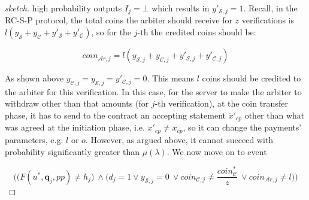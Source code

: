 \begin{proof}[sketch]
high probability outputs $I_{\scriptscriptstyle j}=\bot$ which results in $y'_{\scriptscriptstyle\mathcal{S},j}=1$. Recall, in the RC-S-P protocol, the total coins the arbiter should receive for $z$ verifications is $l(y_{\scriptscriptstyle\mathcal S}+y_{\scriptscriptstyle\mathcal C}+y'_{\scriptscriptstyle\mathcal S}+y'_{\scriptscriptstyle\mathcal C})$, so for the $j$-th the credited coins should be: 
     
     
     \begin{equation}\label{equ::arbiter}
    coin_{\scriptscriptstyle\mathcal{A}r,j}= l(y_{\scriptscriptstyle\mathcal {S},j}+y_{\scriptscriptstyle\mathcal {C},j}+y'_{\scriptscriptstyle\mathcal {S},j}+y'_{\scriptscriptstyle\mathcal {C},j})
     \end{equation}

As shown above $y_{\scriptscriptstyle\mathcal{C},j}=y_{\scriptscriptstyle\mathcal{S},j}=y'_{\scriptscriptstyle\mathcal{C},j}=0$. This means $l$ coins should be credited to the arbiter for this verification.  In this case, for the server to make the arbiter to withdraw other than that amounts (for $j$-th verification), at the coin transfer phase, it has to send to the contract  an accepting  statement $\ddot{x}'_{\scriptscriptstyle cp}$ other than what was agreed at the initiation phase, i.e. $\ddot{x}'_{\scriptscriptstyle cp}\neq\ddot{x}_{\scriptscriptstyle cp}$, so it can change the payments' parameters, e.g. $l$ or $o$. However, as argued above, it cannot succeed with probability significantly greater than $\mu(\lambda)$. We now move on to event 
     
     $$\Bigg(\Big(F(u^{\scriptscriptstyle *}, \bm{q}_{\scriptscriptstyle j}, {pp})\neq h_{\scriptscriptstyle j}\Big) \ \wedge \Big(d_{\scriptscriptstyle j}=1	\vee y_{\scriptscriptstyle \mathcal {S},j}=0 \ \vee coin_{\scriptscriptstyle\mathcal{C},j}\neq \frac{coin_{\scriptscriptstyle\mathcal C}^{\scriptscriptstyle*}}{z} \ \vee  coin_{\scriptscriptstyle\mathcal{A}r,j}\neq l\Big)\Bigg)$$
     

\end{proof}
